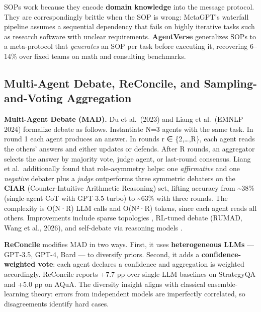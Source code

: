 \documentclass{article}
\begin{document}
SOPs work because they encode \textbf{domain knowledge} into the message protocol. They are correspondingly brittle when the SOP is wrong: MetaGPT's waterfall pipeline assumes a sequential dependency that fails on highly iterative tasks such as research software with unclear requirements. \textbf{AgentVerse} generalizes SOPs to a meta-protocol that \emph{generates} an SOP per task before executing it, recovering 6--14\% over fixed teams on math and consulting benchmarks.

\subsection{Multi-Agent Debate, ReConcile, and Sampling-and-Voting Aggregation}\label{multi-agent-debate-reconcile-and-sampling-and-voting-aggregation}

\textbf{Multi-Agent Debate (MAD).} Du et al.~(2023) and Liang et al.~(EMNLP 2024) formalize debate as follows. Instantiate N=3 agents with the same task. In round 1 each agent produces an answer. In rounds r ∈ \{2,\ldots,R\}, each agent reads the others' answers and either updates or defends. After R rounds, an aggregator selects the answer by majority vote, judge agent, or last-round consensus. Liang et al.~additionally found that role-asymmetry helps: one \emph{affirmative} and one \emph{negative} debater plus a \emph{judge} outperforms three symmetric debaters on the \textbf{CIAR} (Counter-Intuitive Arithmetic Reasoning) set, lifting accuracy from \textasciitilde38\% (single-agent CoT with GPT-3.5-turbo) to \textasciitilde63\% with three rounds. The complexity is O(N·R) LLM calls and O(N²·R) tokens, since each agent reads all others. Improvements include sparse topologies \citep{li2024asurveyonllmbasedm}, RL-tuned debate (RUMAD, Wang et al., 2026), and self-debate via reasoning models \citep{liu20262026}.

\textbf{ReConcile} \citep{chen2024asurveyonllmbasedm} modifies MAD in two ways. First, it uses \textbf{heterogeneous LLMs} --- GPT-3.5, GPT-4, Bard --- to diversify priors. Second, it adds a \textbf{confidence-weighted vote}: each agent declares a confidence and aggregation is weighted accordingly. ReConcile reports +7.7 pp over single-LLM baselines on StrategyQA and +5.0 pp on AQuA. The diversity insight aligns with classical ensemble-learning theory: errors from independent models are imperfectly correlated, so disagreements identify hard cases.
\end{document}
